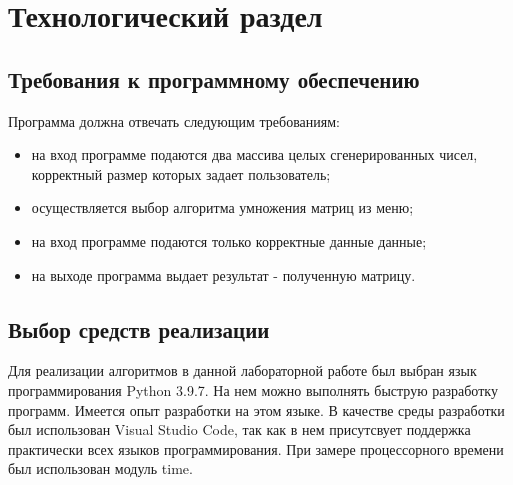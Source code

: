 \chapter{Технологический раздел}
\section{Требования к программному обеспечению}
Программа должна отвечать следующим требованиям:
\begin{itemize}
	\item на вход программе подаются два массива целых сгенерированных чисел, корректный размер которых задает пользователь;
	\item осуществляется выбор алгоритма умножения матриц из меню;
	\item на вход программе подаются только корректные данные данные;
	\item на выходе программа выдает результат - полученную матрицу.
\end{itemize}

\section{Выбор средств реализации}
Для реализации алгоритмов в данной лабораторной работе был выбран язык программирования Python 3.9.7\cite{python3}. На нем можно выполнять быструю разработку программ. Имеется опыт разработки на этом языке. В качестве среды разработки был использован Visual Studio Code\cite{vs}, так как в нем присутсвует поддержка практически всех языков программирования. При замере процессорного времени был использован модуль time\cite{time}.

